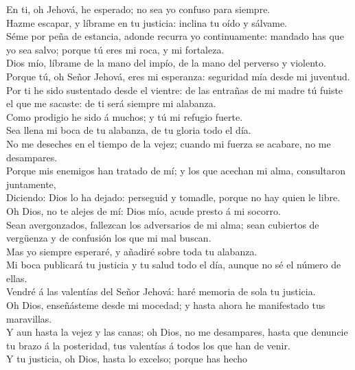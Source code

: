  En ti, oh Jehová, he esperado; no sea yo confuso para
siempre.\\
 Hazme escapar, y líbrame en tu justicia: inclina tu oído y
sálvame.\\
 Séme por peña de estancia, adonde recurra yo continuamente:
mandado has que yo sea salvo; porque tú eres mi roca, y mi fortaleza.\\
 Dios mío, líbrame de la mano del impío, de la mano del
perverso y violento.\\
 Porque tú, oh Señor Jehová, eres mi esperanza: seguridad
mía desde mi juventud.\\
 Por ti he sido sustentado desde el vientre: de las entrañas
de mi madre tú fuiste el que me sacaste: de ti será siempre mi
alabanza.\\
 Como prodigio he sido á muchos; y tú mi refugio fuerte.\\
 Sea llena mi boca de tu alabanza, de tu gloria todo el
día.\\
 No me deseches en el tiempo de la vejez; cuando mi fuerza
se acabare, no me desampares.\\
 Porque mis enemigos han tratado de mí; y los que acechan
mi alma, consultaron juntamente,\\
 Diciendo: Dios lo ha dejado: perseguid y tomadle, porque
no hay quien le libre.\\
 Oh Dios, no te alejes de mí: Dios mío, acude presto á mi
socorro.\\
 Sean avergonzados, fallezcan los adversarios de mi alma;
sean cubiertos de vergüenza y de confusión los que mi mal buscan.\\
 Mas yo siempre esperaré, y añadiré sobre toda tu
alabanza.\\
 Mi boca publicará tu justicia y tu salud todo el día,
aunque no sé el número de ellas.\\
 Vendré á las valentías del Señor Jehová: haré memoria de
sola tu justicia.\\
 Oh Dios, enseñásteme desde mi mocedad; y hasta ahora he
manifestado tus maravillas.\\
 Y aun hasta la vejez y las canas; oh Dios, no me
desampares, hasta que denuncie tu brazo á la posteridad, tus valentías á
todos los que han de venir.\\
 Y tu justicia, oh Dios, hasta lo excelso; porque has hecho
